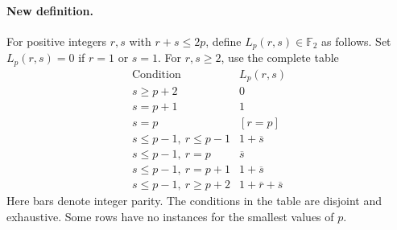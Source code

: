 \documentclass[11pt,oneside]{report}
\theoremstyle{definition}
\numberwithin{equation}{section}
\begin{document}
\paragraph{New definition.}
For positive integers $r,s$ with $r+s\leq2p$, define
$L_p(r,s)\in\mathbb F _2$ as follows.
Set $L_p(r,s)=0$ if $r=1$ or $s=1$.
For $r,s\geq2$, use the complete table
\[
\begin{array}{c|c}
 \text{Condition}&L_p(r,s)\\ \hline
 s\geq p+2&0\\
 s=p+1&1\\
 s=p&[r=p]\\
 s\leq p-1,\ r\leq p-1&1+\overline{s}\\
 s\leq p-1,\ r=p&\overline{s}\\
 s\leq p-1,\ r=p+1&1+\overline{s}\\
 s\leq p-1,\ r\geq p+2&1+\overline{r}+\overline{s}
\end{array}
 \tag{H32.10}
\]
Here bars denote integer parity.
The conditions in the table are disjoint and exhaustive.
Some rows have no instances for the smallest values of $p$.
\end{document}
